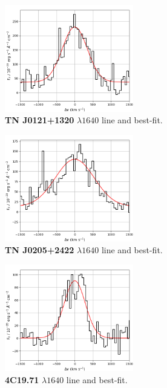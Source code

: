 \begin{appendix}
\begin{figure}
\centering
   \includegraphics[width=0.5\textwidth]{plots_chp4/TN_J0121_HeII.png}
   \caption[TN J0121+1320  line and best-fit]{{\bf TN J0121+1320}  $\lambda1640$ line and best-fit.}
\end{figure}

\begin{figure}
\centering
   \includegraphics[width=0.5\textwidth]{plots_chp4/TN_J0205_HeII.png}
   \caption[TN J0205+2422  line and best-fit]{{\bf TN J0205+2422}  $\lambda1640$ line and best-fit.}
\end{figure}  

\begin{figure}
\centering
 \includegraphics[width=0.5\textwidth]{plots_chp4/4C19_HeII.png}
 \caption[4C19.71  line and best-fit]{{\bf 4C19.71}  $\lambda1640$ line and best-fit.}
\end{figure}


\end{appendix}
